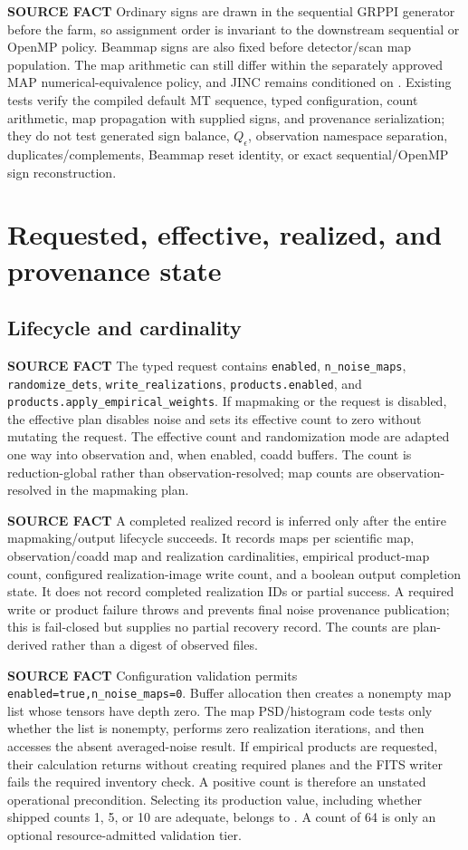 \documentclass[10pt]{article}
\newcommand{\srclabel}{\textbf{SOURCE FACT}}
\begin{document}
\srclabel{} Ordinary signs are drawn in the sequential GRPPI generator before
the farm, so assignment order is invariant to the downstream sequential or
OpenMP policy.  Beammap signs are also fixed before detector/scan map
population.  The map arithmetic can still differ within the separately
approved MAP numerical-equivalence policy, and JINC remains conditioned on
.  Existing tests verify the compiled default MT sequence,
typed configuration, count arithmetic, map propagation with supplied signs,
and provenance serialization; they do not test generated sign balance,
$Q_\epsilon$, observation namespace separation, duplicates/complements,
Beammap reset identity, or exact sequential/OpenMP sign reconstruction.

\section{Requested, effective, realized, and provenance state}
\label{sec:state}

\subsection{Lifecycle and cardinality}

\srclabel{} The typed request contains
\texttt{enabled}, \texttt{n\_noise\_maps}, \texttt{randomize\_dets},
\texttt{write\_realizations}, \texttt{products.enabled}, and
\texttt{products.apply\_empirical\_weights}.  If mapmaking or the request is
disabled, the effective plan disables noise and sets its effective count to
zero without mutating the request.  The effective count and randomization
mode are adapted one way into observation and, when enabled, coadd buffers.
The count is reduction-global rather than observation-resolved; map counts
are observation-resolved in the mapmaking plan.

\srclabel{} A completed realized record is inferred only after the entire
mapmaking/output lifecycle succeeds.  It records maps per scientific map,
observation/coadd map and realization cardinalities, empirical product-map
count, configured realization-image write count, and a boolean output
completion state.  It does not record completed realization IDs or partial
success.  A required write or product failure throws and prevents final noise
provenance publication; this is fail-closed but supplies no partial recovery
record.  The counts are plan-derived rather than a digest of observed files.

\srclabel{} Configuration validation permits
\texttt{enabled=true,n\_noise\_maps=0}.  Buffer allocation then creates a
nonempty map list whose tensors have depth zero.  The map PSD/histogram code
tests only whether the list is nonempty, performs zero realization
iterations, and then accesses the absent averaged-noise result.  If empirical
products are requested, their calculation returns without creating required
planes and the FITS writer fails the required inventory check.  A positive
count is therefore an unstated operational precondition.  Selecting its
production value, including whether shipped counts 1, 5, or 10 are adequate,
belongs to .  A count of 64 is only an optional
resource-admitted validation tier.
\end{document}
